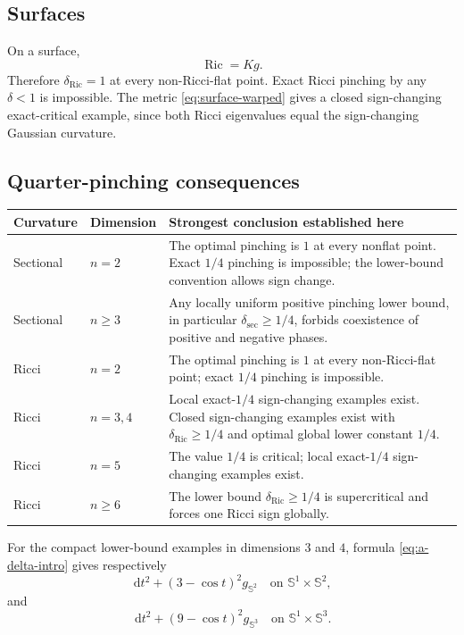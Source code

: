 \documentclass[11pt,reqno]{amsart}
\theoremstyle{definition}
\theoremstyle{remark}
\newcommand{\Ric}{\operatorname{Ric}}
\newcommand{\dd}{\,\mathrm d}
\newcommand{\Sph}{\mathbb S}
\newcommand{\dsec}{\delta_{\mathrm{sec}}}
\newcommand{\dric}{\delta_{\mathrm{Ric}}}
\begin{document}
\subsection{Surfaces}

On a surface,
\[
\Ric=Kg.
\]
Therefore $\dric=1$ at every non-Ricci-flat point.  Exact Ricci pinching by any $\delta<1$ is impossible.  The metric \eqref{eq:surface-warped} gives a closed sign-changing exact-critical example, since both Ricci eigenvalues equal the sign-changing Gaussian curvature.

\subsection{Quarter-pinching consequences}

\begin{center}
\renewcommand{\arraystretch}{1.25}
\begin{tabularx}{\textwidth}{>{\raggedright\arraybackslash}p{}
>{\raggedright\arraybackslash}p{}X}
\toprule
Curvature & Dimension & Strongest conclusion established here \\
\midrule
Sectional & $n=2$ & The optimal pinching is $1$ at every nonflat point.  Exact $1/4$ pinching is impossible; the lower-bound convention allows sign change.\\
Sectional & $n\ge3$ & Any locally uniform positive pinching lower bound, in particular $\dsec\ge1/4$, forbids coexistence of positive and negative phases.\\
Ricci & $n=2$ & The optimal pinching is $1$ at every non-Ricci-flat point; exact $1/4$ pinching is impossible.\\
Ricci & $n=3,4$ & Local exact-$1/4$ sign-changing examples exist.  Closed sign-changing examples exist with $\dric\ge1/4$ and optimal global lower constant $1/4$.\\
Ricci & $n=5$ & The value $1/4$ is critical; local exact-$1/4$ sign-changing examples exist.\\
Ricci & $n\ge6$ & The lower bound $\dric\ge1/4$ is supercritical and forces one Ricci sign globally.\\
\bottomrule
\end{tabularx}
\end{center}

For the compact lower-bound examples in dimensions $3$ and $4$, formula \eqref{eq:a-delta-intro} gives respectively
\[
\dd t^2+(3-\cos t)^2g_{\Sph^2}
\quad\text{on }\Sph^1\times\Sph^2,
\]
and
\[
\dd t^2+(9-\cos t)^2g_{\Sph^3}
\quad\text{on }\Sph^1\times\Sph^3.
\]
\end{document}
